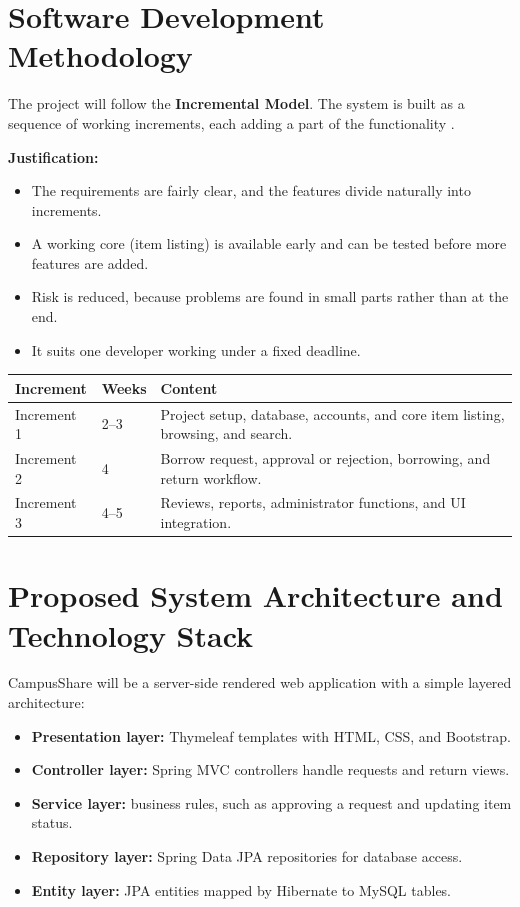 \documentclass[11pt,a4paper]{article}
\begin{document}
\section{Software Development Methodology}
The project will follow the \textbf{Incremental Model}. The system is built as a sequence of working increments, each adding a part of the functionality \cite{sommerville2016,pressman2019}.

\textbf{Justification:}
\begin{itemize}
  \item The requirements are fairly clear, and the features divide naturally into increments.
  \item A working core (item listing) is available early and can be tested before more features are added.
  \item Risk is reduced, because problems are found in small parts rather than at the end.
  \item It suits one developer working under a fixed deadline.
\end{itemize}

\begin{tabularx}{\textwidth}{@{}l l X@{}}
\toprule
\textbf{Increment} & \textbf{Weeks} & \textbf{Content}\\
\midrule
Increment 1 & 2--3 & Project setup, database, accounts, and core item listing, browsing, and search.\\
Increment 2 & 4 & Borrow request, approval or rejection, borrowing, and return workflow.\\
Increment 3 & 4--5 & Reviews, reports, administrator functions, and UI integration.\\
\bottomrule
\end{tabularx}

\section{Proposed System Architecture and Technology Stack}
CampusShare will be a server-side rendered web application with a simple layered architecture:
\begin{itemize}
  \item \textbf{Presentation layer:} Thymeleaf templates with HTML, CSS, and Bootstrap.
  \item \textbf{Controller layer:} Spring MVC controllers handle requests and return views.
  \item \textbf{Service layer:} business rules, such as approving a request and updating item status.
  \item \textbf{Repository layer:} Spring Data JPA repositories for database access.
  \item \textbf{Entity layer:} JPA entities mapped by Hibernate to MySQL tables.
\end{itemize}
\end{document}
